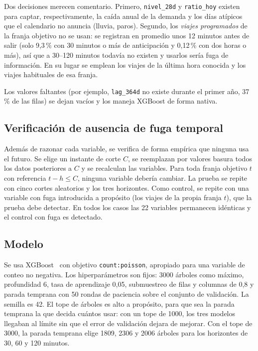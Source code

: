 \documentclass[11pt,a4paper]{article}
\begin{document}
Dos decisiones merecen comentario. Primero, \texttt{nivel\_28d} y \texttt{ratio\_hoy} existen para captar, respectivamente, la caída anual de la demanda y los días atípicos que el calendario no anuncia (lluvia, paros). Segundo, los \emph{viajes programados} de la franja objetivo no se usan: se registran en promedio unos 12 minutos antes de salir (solo 9,3\,\% con 30 minutos o más de anticipación y 0,12\,\% con dos horas o más), así que a 30--120 minutos todavía no existen y usarlos sería fuga de información. En su lugar se emplean los viajes de la última hora conocida y los viajes habituales de esa franja.

Los valores faltantes (por ejemplo, \texttt{lag\_364d} no existe durante el primer año, 37\,\% de las filas) se dejan vacíos y los maneja XGBoost de forma nativa.

\subsection{Verificación de ausencia de fuga temporal}

Además de razonar cada variable, se verifica de forma empírica que ninguna usa el futuro. Se elige un instante de corte $C$, se reemplazan por valores basura todos los datos posteriores a $C$ y se recalculan las variables. Para toda franja objetivo $t$ con referencia $t-h \le C$, ninguna variable debería cambiar. La prueba se repite con cinco cortes aleatorios y los tres horizontes. Como control, se repite con una variable con fuga introducida a propósito (los viajes de la propia franja $t$), que la prueba debe detectar. En todos los casos las 22 variables permanecen idénticas y el control con fuga es detectado.

\subsection{Modelo}

Se usa XGBoost~\cite{chen2016xgboost} con objetivo \texttt{count:poisson}, apropiado para una variable de conteo no negativa. Los hiperparámetros son fijos: 3000 árboles como máximo, profundidad 6, tasa de aprendizaje 0,05, submuestreo de filas y columnas de 0,8 y parada temprana con 50 rondas de paciencia sobre el conjunto de validación. La semilla es 42. El tope de árboles es alto a propósito, para que sea la parada temprana la que decida cuántos usar: con un tope de 1000, los tres modelos llegaban al límite sin que el error de validación dejara de mejorar. Con el tope de 3000, la parada temprana elige 1809, 2306 y 2006 árboles para los horizontes de 30, 60 y 120 minutos.
\end{document}
